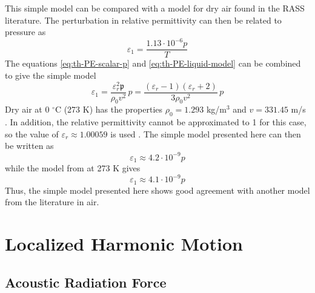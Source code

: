 \documentclass[11pt,twoside]{eitExjobb}
\begin{document}
	This simple model can be compared with a model for dry air found in the RASS literature. The perturbation in relative permittivity can then be related to pressure as \cite{Rapoport1997}
	\begin{equation*}
		\varepsilon_1 = \frac{1.13 \cdot 10^{-6} p}{T}
	\end{equation*}
	The equations \eqref{eq:th-PE-scalar-p} and \eqref{eq:th-PE-liquid-model} can be combined to give the simple model
	\begin{equation*}
		\varepsilon_1 = \frac{\varepsilon_r^2 \mathfrak{p}}{\rho_0 v^2} \,p = \frac{(\varepsilon_r - 1)(\varepsilon_r + 2)}{3\rho_0 v^2} \,p
	\end{equation*}
	Dry air at 0 $^\circ$C (273 K) has the properties $\rho_0 = 1.293$ kg/m$^3$ and $v = 331.45$ m/s \cite{Onda2003}. In addition, the relative permittivity cannot be approximated to 1 for this case, so the value of $\varepsilon_r \approx 1.00059$ is used \cite{Hector1936}. The simple model presented here can then be written as
	\begin{equation*}
		\varepsilon_1 \approx 4.2 \cdot 10^{-9} p
	\end{equation*}
	while the model from \cite{Rapoport1997} at 273 K gives
	\begin{equation*}
		\varepsilon_1 \approx 4.1 \cdot 10^{-9} p
	\end{equation*}
	Thus, the simple model presented here shows good agreement with another model from the literature in air.
	
	
	\section{Localized Harmonic Motion}
	
	\subsection{Acoustic Radiation Force}
	
\end{document}
